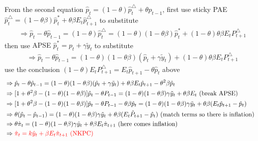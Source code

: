 \documentclass{article}
\begin{document}
From the second equation $\hat p_t=(1-\theta)\hat p_t^\triangle +\theta \hat p_{t-1}$, first use sticky PAE $\hat p_t^\triangle=(1-\theta \beta) \hat p_t^* +\theta \beta E_t \hat p_{t+1}^\triangle$ to substitute
\begin{align}
& \Rightarrow \hat p_t-\theta \hat p_{t-1}=(1-\theta)\hat p_t^\triangle = (1-\theta)(1-\theta \beta)\hat p_t^* 
+(1-\theta)\theta \beta E_t P^\triangle_{t+1}
\end{align}
then use {\color{red} APSE $\hat p_t^*=\hat p_t+\gamma \tilde y_t$} to substitute
\begin{align}
& \Rightarrow \hat p_t -\theta \hat p_{t-1}=(1-\theta)(1-\theta \beta)(\hat p_t+\gamma \tilde y_t)
+(1-\theta)\theta \beta E_t P^\triangle_{t+1}
\end{align}
use the conclusion $(1-\theta)E_t P_{t+1}^\triangle=E_t \hat p_{t+1} - \theta \hat p_t$ above
\begin{align}
& \Rightarrow \hat p_t -\theta \hat p_{t-1}=(1-\theta)(1-\theta \beta)(\hat p_t+\gamma \tilde y_t)+\theta \beta E_t \hat p_{t+1} -\theta^2 \beta \hat p_t
\\& \Rightarrow [1+\theta^2 \beta-(1-\theta)(1-\theta \beta)]\hat p_t -\theta P_{t-1}= (1-\theta)(1-\theta \beta) \gamma \tilde y_t +\theta \beta E_t \text{ (break APSE)}
\\& \Rightarrow 
[1+\theta^2 \beta-(1-\theta)(1-\theta \beta)]\hat p_t -\theta P_{t-1}-\theta \beta \hat p_t = (1-\theta)(1-\theta \beta)\gamma \tilde y_t +\theta \beta (E_t \hat p_{t+1}-\hat p_t)
\\& \Rightarrow 
\theta(\hat p_t -\hat p_{t-1})=(1-\theta)(1-\theta \beta)\gamma \tilde y_t +\theta \beta (E_t \hat P_{t+1}-\hat p_t) 
\text{ (match terms so there is inflation)}
\\& \Rightarrow 
\theta \hat \pi_t = (1-\theta )(1-\theta \beta)\gamma \tilde y_t +\theta \beta E_t \hat \pi_{t+1}
\text{ (here comes inflation)}
\\& \Rightarrow \color{red} \hat \pi_t=k \hat y_t+\beta E_t \hat \pi_{t+1} \text{ (NKPC)}
\end{align}
\end{document}
